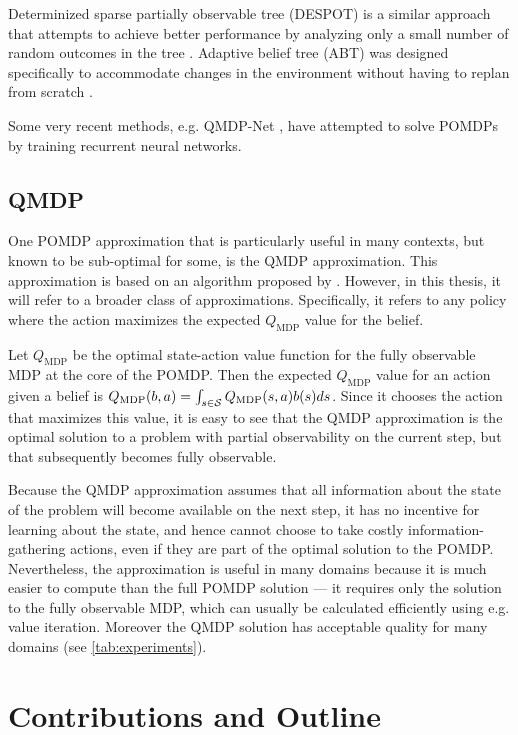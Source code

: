 Determinized sparse partially observable tree (DESPOT) is a similar approach that attempts to achieve better performance by analyzing only a small number of random outcomes in the tree \cite{somani2013despot}.
Adaptive belief tree (ABT) was designed specifically to accommodate changes in the environment without having to replan from scratch \cite{kurniawati2016online}.

Some very recent methods, e.g. QMDP-Net \cite{karkus2017qmdp}, have attempted to solve POMDPs by training recurrent neural networks.

\subsection{QMDP} \label{sec:qmdp}

One POMDP approximation that is particularly useful in many contexts, but known to be sub-optimal for some, is the QMDP approximation.
This approximation is based on an algorithm proposed by \citet{littman1995learning}.
However, in this thesis, it will refer to a broader class of approximations.
Specifically, it refers to any policy where the action maximizes the expected $Q_\text{MDP}$ value for the belief.

Let $Q_\text{MDP}$ be the optimal state-action value function for the fully observable MDP at the core of the POMDP.
Then the expected $Q_\text{MDP}$ value for an action given a belief is $Q_\text{MDP}(b,a) = \int_{s \in \mathcal{S}} Q_\text{MDP}(s,a) b(s) ds$.
Since it chooses the action that maximizes this value, it is easy to see that the QMDP approximation is the optimal solution to a problem with partial observability on the current step, but that subsequently becomes fully observable.

Because the QMDP approximation assumes that all information about the state of the problem will become available on the next step, it has no incentive for learning about the state, and hence cannot choose to take costly information-gathering actions, even if they are part of the optimal solution to the POMDP.
Nevertheless, the approximation is useful in many domains because it is much easier to compute than the full POMDP solution --- it requires only the solution to the fully observable MDP, which can usually be calculated efficiently using e.g. value iteration.
Moreover the QMDP solution has acceptable quality for many domains (see \cref{tab:experiments}).

\section{Contributions and Outline}

